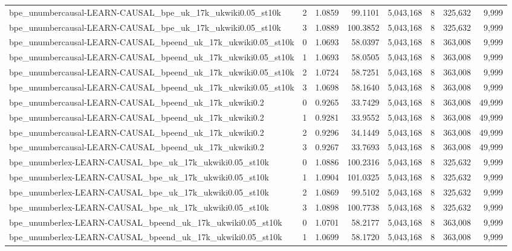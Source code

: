 \begin{tabular}{lrrrrrrr}
bpe\_unumbercausal-LEARN-CAUSAL\_bpe\_uk\_17k\_ukwiki0.05\_st10k & 2 & 1.0859 & 99.1101 & 5,043,168 & 8 & 325,632 & 9,999 \\
bpe\_unumbercausal-LEARN-CAUSAL\_bpe\_uk\_17k\_ukwiki0.05\_st10k & 3 & 1.0889 & 100.3852 & 5,043,168 & 8 & 325,632 & 9,999 \\
bpe\_unumbercausal-LEARN-CAUSAL\_bpeend\_uk\_17k\_ukwiki0.05\_st10k & 0 & 1.0693 & 58.0397 & 5,043,168 & 8 & 363,008 & 9,999 \\
bpe\_unumbercausal-LEARN-CAUSAL\_bpeend\_uk\_17k\_ukwiki0.05\_st10k & 1 & 1.0693 & 58.0505 & 5,043,168 & 8 & 363,008 & 9,999 \\
bpe\_unumbercausal-LEARN-CAUSAL\_bpeend\_uk\_17k\_ukwiki0.05\_st10k & 2 & 1.0724 & 58.7251 & 5,043,168 & 8 & 363,008 & 9,999 \\
bpe\_unumbercausal-LEARN-CAUSAL\_bpeend\_uk\_17k\_ukwiki0.05\_st10k & 3 & 1.0698 & 58.1640 & 5,043,168 & 8 & 363,008 & 9,999 \\
bpe\_unumbercausal-LEARN-CAUSAL\_bpeend\_uk\_17k\_ukwiki0.2 & 0 & 0.9265 & 33.7429 & 5,043,168 & 8 & 363,008 & 49,999 \\
bpe\_unumbercausal-LEARN-CAUSAL\_bpeend\_uk\_17k\_ukwiki0.2 & 1 & 0.9281 & 33.9552 & 5,043,168 & 8 & 363,008 & 49,999 \\
bpe\_unumbercausal-LEARN-CAUSAL\_bpeend\_uk\_17k\_ukwiki0.2 & 2 & 0.9296 & 34.1449 & 5,043,168 & 8 & 363,008 & 49,999 \\
bpe\_unumbercausal-LEARN-CAUSAL\_bpeend\_uk\_17k\_ukwiki0.2 & 3 & 0.9267 & 33.7693 & 5,043,168 & 8 & 363,008 & 49,999 \\
bpe\_unumberlex-LEARN-CAUSAL\_bpe\_uk\_17k\_ukwiki0.05\_st10k & 0 & 1.0886 & 100.2316 & 5,043,168 & 8 & 325,632 & 9,999 \\
bpe\_unumberlex-LEARN-CAUSAL\_bpe\_uk\_17k\_ukwiki0.05\_st10k & 1 & 1.0904 & 101.0325 & 5,043,168 & 8 & 325,632 & 9,999 \\
bpe\_unumberlex-LEARN-CAUSAL\_bpe\_uk\_17k\_ukwiki0.05\_st10k & 2 & 1.0869 & 99.5102 & 5,043,168 & 8 & 325,632 & 9,999 \\
bpe\_unumberlex-LEARN-CAUSAL\_bpe\_uk\_17k\_ukwiki0.05\_st10k & 3 & 1.0898 & 100.7738 & 5,043,168 & 8 & 325,632 & 9,999 \\
bpe\_unumberlex-LEARN-CAUSAL\_bpeend\_uk\_17k\_ukwiki0.05\_st10k & 0 & 1.0701 & 58.2177 & 5,043,168 & 8 & 363,008 & 9,999 \\
bpe\_unumberlex-LEARN-CAUSAL\_bpeend\_uk\_17k\_ukwiki0.05\_st10k & 1 & 1.0699 & 58.1720 & 5,043,168 & 8 & 363,008 & 9,999 \\

\end{tabular}

